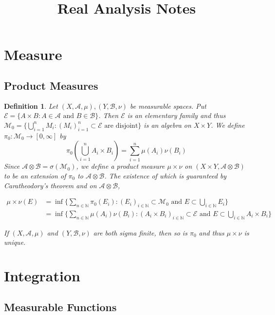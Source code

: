 \documentclass[12pt]{amsart}
\newtheorem{defn}[thm]{Definition}
\newcommand{\sig}{\sigma}
\newcommand{\N}{\mathbb{N}}
\newcommand{\MA}{\mathcal{A}}
\newcommand{\MB}{\mathcal{B}}
\newcommand{\ME}{\mathcal{E}}
\newcommand{\MM}{\mathcal{M}}
\newcommand{\RG}{[0,\infty]}
\begin{document}
\title{Real Analysis Notes}
\maketitle

\tableofcontents

\section{Measure}

\subsection{Product Measures}

\begin{defn}
Let $(X,\MA, \mu), (Y,\MB, \nu)$ be measurable spaces. Put $\ME = \{A \times B: A \in \MA \text{ and } B \in \MB\}$. Then $\ME$ is an elementary family and thus $\MM_0 = \{\bigcup_{i =1}^n M_i: (M_i)_{i=1 }^n \subset \ME \text{ are disjoint}\}$ is an algebra on $X \times Y$. We define $\pi_0: \MM_0 \rightarrow \RG$ by $$\pi_0(\bigcup_{i=1}^n A_i \times B_i) = \sum_{i=1}^n\mu(A_i)\nu(B_i)$$ Since $\MA \otimes \MB = \sig(\MM_0)$, we define a product measure $\mu \times \nu$ on $(X \times Y, \MA \otimes \MB)$ to be an extension of $\pi_0$ to $\MA \otimes \MB$. The existence of which is guaranteed by Caratheodory's theorem and on $\MA \otimes \MB$, 

\begin{align*}
\mu \times \nu(E) 
&= \inf \{\sum_{n \in \N}\pi_0(E_i): (E_i)_{i \in \N} \subset \MM_0 \text{ and } E \subset \bigcup_{i \in \N} E_i\}\\
&= \inf \{\sum_{n \in \N}\mu(A_i)\nu(B_i): (A_i \times B_i)_{i \in \N} \subset \ME \text{ and } E \subset \bigcup_{i \in \N} A_i \times B_i \}
\end{align*}

If $(X,\MA, \mu)$ and $(Y,\MB, \nu)$ are both sigma finite, then so is $\pi_0$ and thus $\mu \times \nu$ is unique.
\end{defn}

\section{Integration}

\subsection{Measurable Functions}
\end{document}
